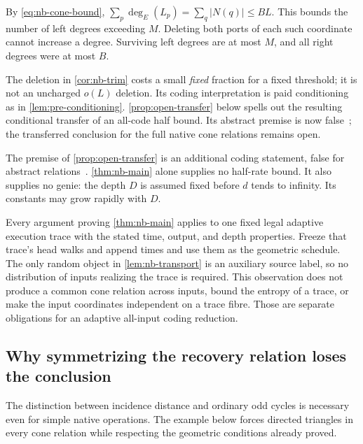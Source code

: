 \begin{informalproof}
By \eqref{eq:nb-cone-bound},
$\sum_p\deg_E(L_p)=\sum_q|N(q)|\le BL$.
This bounds the number of left degrees exceeding $M$.  Deleting both
ports of each such coordinate cannot increase a degree.  Surviving
left degrees are at most $M$, and all right degrees were at most $B$.
\end{informalproof}

The deletion in \cref{cor:nb-trim} costs a small \emph{fixed}
fraction for a fixed threshold; it is not an uncharged $o(L)$ deletion.
Its coding interpretation is paid conditioning as in
\cref{lem:pre-conditioning}.  \cref{prop:open-transfer} below
spells out the resulting conditional transfer of an all-code half bound.
Its abstract premise is now false~\cite{StorageCodes2026}; the transferred
conclusion for the full native cone relations remains open.

\begin{remark}\label{rem:nb-scope}
The premise of \cref{prop:open-transfer} is an additional
coding statement, false for abstract relations~\cite{StorageCodes2026}.
\cref{thm:nb-main} alone supplies no half-rate
bound.  It also supplies no genie: the depth $D$ is assumed fixed before
$d$ tends to infinity.  Its constants may grow rapidly with $D$.

Every argument proving \cref{thm:nb-main} applies to one fixed legal
adaptive execution trace with the stated time, output, and depth
properties.  Freeze that trace's head walks and append times and use
them as the geometric schedule.  The only random object in
\cref{lem:nb-transport} is an auxiliary source label, so no distribution
of inputs realizing the trace is required.  This observation does not
produce a common cone relation across inputs, bound the entropy of a
trace, or make the input coordinates independent on a trace fibre.
Those are separate obligations for an adaptive all-input coding
reduction.
\end{remark}

\subsection{Why symmetrizing the recovery relation loses the conclusion}

The distinction between incidence distance and ordinary odd cycles is
necessary even for simple native operations.  The example below forces
directed triangles in every cone relation while respecting the geometric
conditions already proved.

